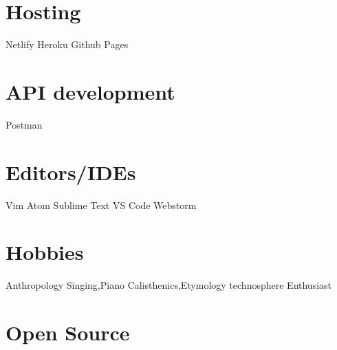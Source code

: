 \documentclass[english]{cv-style}     %
\begin{document}
\begin{aside}
\section{Hosting}
\vspace{0.3cm}
Netlify
Heroku
Github Pages

\section{API development}
\vspace{0.3cm}
Postman

\section{Editors/IDEs}
\vspace{0.3cm}
Vim
Atom
Sublime Text
VS Code
Webstorm


\section{Hobbies}
\vspace{0.2cm}
Anthropology
Singing,Piano
Calisthenics,Etymology
technosphere Enthusiast





\end{aside}
\vspace{0.2cm}


\section{Open Source}
\vspace{-0.2cm}
\end{document}
